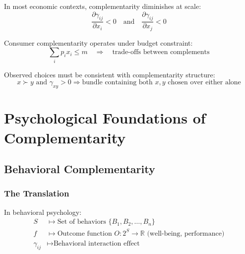 \begin{axiom}
In most economic contexts, complementarity diminishes at scale:
\begin{equation}
\frac{\partial \gamma_{ij}}{\partial x_i} < 0 \quad \text{and} \quad \frac{\partial \gamma_{ij}}{\partial x_j} < 0
\end{equation}
\end{axiom}

\begin{axiom}
Consumer complementarity operates under budget constraint:
\begin{equation}
\sum_i p_i x_i \leq m \quad \Rightarrow \quad \text{trade-offs between complements}
\end{equation}
\end{axiom}

\begin{axiom}
Observed choices must be consistent with complementarity structure:
\begin{equation}
x \succ y \text{ and } \gamma_{xy} > 0 \Rightarrow \text{bundle containing both } x,y \text{ chosen over either alone}
\end{equation}
\end{axiom}

\section{Psychological Foundations of Complementarity}
\label{sec:psychology}

\subsection{Behavioral Complementarity}

\subsubsection{The Translation}

\begin{axiom}
In behavioral psychology:
\begin{align}
S &\mapsto \text{Set of behaviors } \{B_1, B_2, \ldots, B_n\} \\
f &\mapsto \text{Outcome function } O: 2^S \to \mathbb{R} \text{ (well-being, performance)} \\
\gamma_{ij} &\mapsto \text{Behavioral interaction effect}
\end{align}
\end{axiom}

